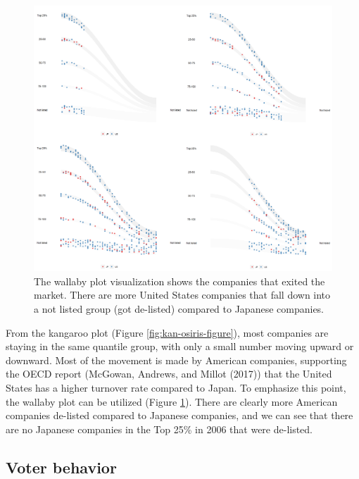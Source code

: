 \begin{figure}

{\centering \includegraphics[width=1\linewidth]{figures/animation-exit} 

}

\caption{The wallaby plot visualization shows the companies that exited the market. There are more United States companies that fall down into a not listed group (got de-listed) compared to Japanese companies.}\label{fig:osiris-figure}
\end{figure}

From the kangaroo plot (Figure \ref{fig:kan-osiris-figure}), most companies are staying in the same quantile group, with only a small number moving upward or downward. Most of the movement is made by American companies, supporting the OECD report (McGowan, Andrews, and Millot (2017)) that the United States has a higher turnover rate compared to Japan. To emphasize this point, the wallaby plot can be utilized (Figure \ref{fig:osiris-figure}). There are clearly more American companies de-listed compared to Japanese companies, and we can see that there are no Japanese companies in the Top 25\% in 2006 that were de-listed.

\hypertarget{voter-behavior}{%
\subsection{Voter behavior}\label{voter-behavior}}

